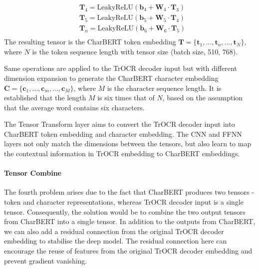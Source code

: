 \begin{equation} \label{eq:3_tensor_transform_ffnn}
    \begin{split}
        &\mathbf{T}_{4} = \text{LeakyReLU}(\mathbf{b}_4 + \mathbf{W}_4\cdot \mathbf{T}_{3})\\
        &\mathbf{T}_{5} = \text{LeakyReLU}(\mathbf{b}_5 + \mathbf{W}_5\cdot \mathbf{T}_{4})\\
        &\mathbf{T}_{n} = \text{LeakyReLU}(\mathbf{b}_6 + \mathbf{W}_6\cdot \mathbf{T}_{5})\\
    \end{split}
\end{equation}
The resulting tensor is the CharBERT token embedding $\mathbf{T} = \{\mathbf{t}_1, ..., \mathbf{t}_n, ..., \mathbf{t}_N\}$, where $N$ is the token sequence length with tensor size (batch size, 510, 768).

Same operations are applied to the TrOCR decoder input but with different dimension expansion to generate the CharBERT character embedding $\mathbf{C} = \{\mathbf{c}_1, ..., \mathbf{c}_m, ..., \mathbf{c}_M\}$, where $M$ is the character sequence length. It is established that the length $M$ is six times that of $N$, based on the assumption that the average word contains six characters.

The Tensor Transform layer aims to convert the TrOCR decoder input into CharBERT token embedding and character embedding. The CNN and FFNN layers not only match the dimensions between the tensors, but also learn to map the contextual information in TrOCR embedding to CharBERT embeddings.

\paragraph*{Tensor Combine}
\label{par:3_tensor_combine}
The fourth problem arises due to the fact that CharBERT produces two tensors - token and character representations, whereas TrOCR decoder input is a single tensor. Consequently, the solution would be to combine the two output tensors from CharBERT into a single tensor. In addition to the outputs from CharBERT, we can also add a residual connection from the original TrOCR decoder embedding to stabilise the deep model. The residual connection here can encourage the reuse of features from the original TrOCR decoder embedding and prevent gradient vanishing.


